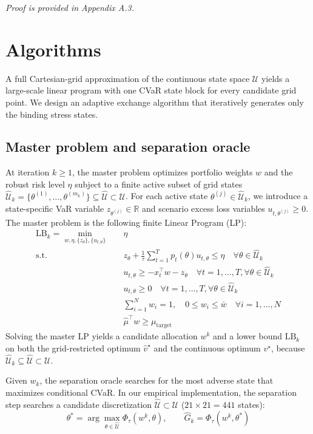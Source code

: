 \documentclass[smallextended]{svjour3}
\begin{document}
\textit{Proof is provided in Appendix A.3.}


\section{Algorithms}
A full Cartesian-grid approximation of the continuous state space $\mathcal{U}$ yields a large-scale linear program with one CVaR state block for every candidate grid point. We design an adaptive exchange algorithm that iteratively generates only the binding stress states.

\subsection{Master problem and separation oracle}
At iteration $k \ge 1$, the master problem optimizes portfolio weights $w$ and the robust risk level $\eta$ subject to a finite active subset of grid states $\widehat{\mathcal{U}}_k = \{\theta^{(1)}, \dots, \theta^{(m_k)}\} \subseteq \widehat{\mathcal{U}} \subset \mathcal{U}$. For each active state $\theta^{(j)} \in \widehat{\mathcal{U}}_k$, we introduce a state-specific VaR variable $z_{\theta^{(j)}} \in \mathbb{R}$ and scenario excess loss variables $u_{t, \theta^{(j)}} \ge 0$. The master problem is the following finite Linear Program (LP):
\begin{align}
    \mathrm{LB}_k = \min_{w, \eta, \{z_\theta\}, \{u_{t,\theta}\}} \quad & \eta \\
    \text{s.t.} \quad & z_\theta + \frac{1}{\tau} \sum_{t=1}^{T} p_t(\theta) u_{t,\theta} \le \eta \quad \forall \theta \in \widehat{\mathcal{U}}_k \\
    & u_{t,\theta} \ge -x_t^\top w - z_\theta \quad \forall t=1,\dots,T, \forall \theta \in \widehat{\mathcal{U}}_k \\
    & u_{t,\theta} \ge 0 \quad \forall t=1,\dots,T, \forall \theta \in \widehat{\mathcal{U}}_k \\
    & \sum_{i=1}^N w_i = 1, \quad 0 \le w_i \le \bar{w} \quad \forall i=1,\dots,N \\
    & \hat{\mu}^\top w \ge \mu_{\text{target}}
\end{align}
Solving the master LP yields a candidate allocation $w^k$ and a lower bound $\mathrm{LB}_k$ on both the grid-restricted optimum $\widehat v^\star$ and the continuous optimum $v^\star$, because $\widehat{\mathcal{U}}_k\subseteq\widehat{\mathcal{U}}\subset\mathcal{U}$.

Given $w_k$, the separation oracle searches for the most adverse state that maximizes conditional CVaR. In our empirical implementation, the separation step searches a candidate discretization $\widehat{\mathcal{U}} \subset \mathcal{U}$ ($21\times21 = 441$ states):
\begin{equation}
    \theta^* = \arg\max_{\theta \in \widehat{\mathcal{U}}} \Phi_\tau(w^k, \theta), \qquad \widehat{G}_k = \Phi_\tau(w^k, \theta^*)
\end{equation}
\end{document}

